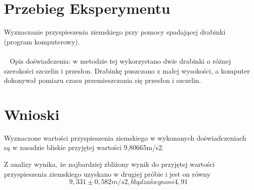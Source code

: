 \documentclass[14pt, letterpaper]{article}
\begin{document}
\section{Przebieg Eksperymentu}

Wyznaczanie przyspieszenia ziemskiego przy pomocy spadającej drabinki 
(program komputerowy).\\\\
 
Opis doświadczenia: 
w metodzie tej wykorzystano dwie drabinki o różnej szerokości szczelin i przesłon. Drabinkę puszczano z małej wysokości, a komputer dokonywał pomiaru czasu przemieszczania się przesłon i szczelin.


\section{Wnioski}

Wyznaczone wartości przyspieszenia ziemskiego w wykonanych doświadczeniach są w zasadzie bliskie przyjętej wartości 9,80665m/s2.

Z analizy wynika, że najbardziej zbliżony wynik do przyjętej wartości przyspieszenia ziemskiego uzyskano w drugiej próbie 
i jest on równy \begin{equation}
    9,331±0,582m/s2 , błąd zaś wynosi 4,91%

\end{equation}
\end{document}

